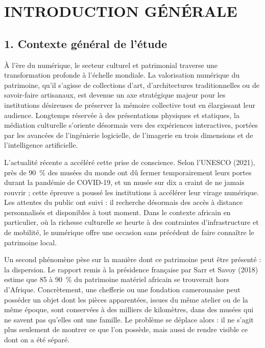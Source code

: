 \cleardoublepage
{}
\chapter*{INTRODUCTION GÉNÉRALE}

\section*{1. Contexte général de l'étude}

À l'ère du numérique, le secteur culturel et patrimonial traverse une
transformation profonde à l'échelle mondiale. La valorisation numérique du
patrimoine, qu'il s'agisse de collections d'art, d'architectures
traditionnelles ou de savoir-faire artisanaux, est devenue un axe stratégique
majeur pour les institutions désireuses de préserver la mémoire collective tout
en élargissant leur audience. Longtemps réservée à des présentations physiques
et statiques, la médiation culturelle s'oriente désormais vers des expériences
interactives, portées par les avancées de l'ingénierie logicielle, de l'imagerie
en trois dimensions et de l'intelligence artificielle.

L'actualité récente a accéléré cette prise de conscience. Selon l'UNESCO (2021),
près de 90~\% des musées du monde ont dû fermer temporairement leurs portes
durant la pandémie de COVID-19, et un musée sur dix a craint de ne jamais
rouvrir ; cette épreuve a poussé les institutions à accélérer leur virage
numérique. Les attentes du public ont suivi : il recherche désormais des accès à
distance personnalisés et disponibles à tout moment. Dans le contexte africain
en particulier, où la richesse culturelle se heurte à des contraintes
d'infrastructure et de mobilité, le numérique offre une occasion sans précédent
de faire connaître le patrimoine local.

Un second phénomène pèse sur la manière dont ce patrimoine peut être présenté :
la dispersion. Le rapport remis à la présidence française par Sarr et Savoy
(2018) estime que 85 à 90~\% du patrimoine matériel africain se trouverait hors
d'Afrique. Concrètement, une chefferie ou une fondation camerounaise peut
posséder un objet dont les pièces apparentées, issues du même atelier ou de la
même époque, sont conservées à des milliers de kilomètres, dans des musées qui
ne savent pas qu'elles ont une famille. Le problème se déplace alors : il ne
s'agit plus seulement de montrer ce que l'on possède, mais aussi de rendre
visible ce dont on a été séparé.

